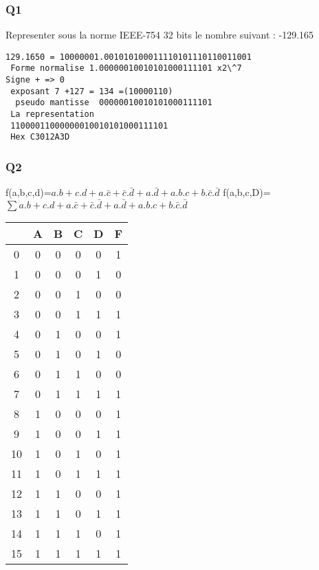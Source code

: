 \subsubsection{Q1}

Representer sous la norme IEEE-754 32 bits le nombre suivant : -129.165

\begin{verbatim}129.1650 = 10000001.001010100011110101110110011001
 Forme normalise 1.00000010010101000111101 x2\^7
Signe + => 0
 exposant 7 +127 = 134 =(10000110)
  pseudo mantisse  00000010010101000111101 
 La representation 
 11000011000000010010101000111101
 Hex C3012A3D

\end{verbatim}
\subsubsection{Q2}

f(a,b,c,d)=$a.b+c.d+a.\bar c+\bar c.\bar d + a.\bar d+a.b.c+b.\bar c.\bar d$
f(a,b,c,D)=$ \sum a.b+c.d+a.\bar c+\bar c.\bar d + a.\bar d+a.b.c+b.\bar c.\bar d $ 

        \begin{tabular}{|c|c|c|c|c||c|}
    \toprule
         & A & B & C & D & F\\ \midrule0 & 0 & 0 & 0 & 0 & 1\\1 & 0 & 0 & 0 & 1 & 0\\2 & 0 & 0 & 1 & 0 & 0\\3 & 0 & 0 & 1 & 1 & 1\\\midrule4 & 0 & 1 & 0 & 0 & 1\\5 & 0 & 1 & 0 & 1 & 0\\6 & 0 & 1 & 1 & 0 & 0\\7 & 0 & 1 & 1 & 1 & 1\\\midrule8 & 1 & 0 & 0 & 0 & 1\\9 & 1 & 0 & 0 & 1 & 1\\10 & 1 & 0 & 1 & 0 & 1\\11 & 1 & 0 & 1 & 1 & 1\\\midrule12 & 1 & 1 & 0 & 0 & 1\\13 & 1 & 1 & 0 & 1 & 1\\14 & 1 & 1 & 1 & 0 & 1\\15 & 1 & 1 & 1 & 1 & 1\\\bottomrule
        \end{tabular}
        
